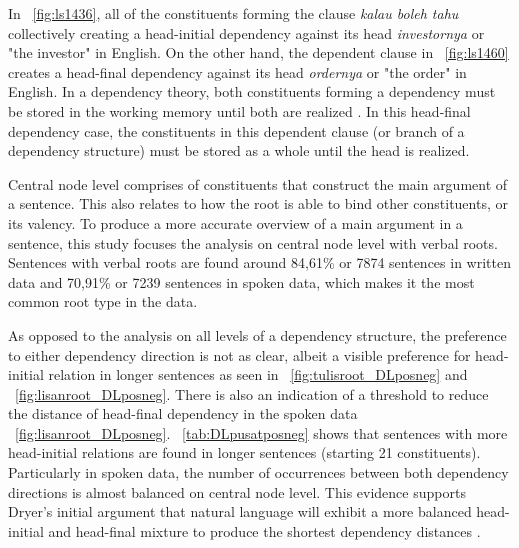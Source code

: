 \documentclass[10pt, a4paper, conference, compsocconf]{IEEEtran}
\begin{document}
In \pic~\ref{fig:ls1436}, all of the constituents forming the clause \textit{kalau boleh tahu} collectively creating a head-initial dependency against its head \textit{investornya} or "the investor" in English. On the other hand, the dependent clause in \pic~\ref{fig:ls1460} creates a head-final dependency against its head \textit{ordernya} or "the order" in English. In a dependency theory, both constituents forming a dependency must be stored in the working memory until both are realized \cite{tesniere1959elements}. In this head-final dependency case, the constituents in this dependent clause (or branch of a dependency structure) must be stored as a whole until the head is realized. 

Central node level comprises of constituents that construct the main argument of a sentence. This also relates to how the root is able to bind other constituents, or its valency. To produce a more accurate overview of a main argument in a sentence, this study focuses the analysis on central node level with verbal roots. Sentences with verbal roots are found around 84,61\% or 7874 sentences in written data and 70,91\% or 7239 sentences in spoken data, which makes it the most common root type in the data.

As opposed to the analysis on all levels of a dependency structure, the preference to either dependency direction is not as clear, albeit a visible preference for head-initial relation in longer sentences as seen in \pic~\ref{fig:tulisroot_DLposneg} and \pic~\ref{fig:lisanroot_DLposneg}. There is also an indication of a threshold to reduce the distance of head-final dependency in the spoken data \pic~\ref{fig:lisanroot_DLposneg}. \tab~\ref{tab:DLpusatposneg} shows that sentences with more head-initial relations are found in longer sentences (starting 21 constituents). Particularly in spoken data, the number of occurrences between both dependency directions is almost balanced on central node level. This evidence supports Dryer's initial argument that natural language will exhibit a more balanced head-initial and head-final mixture to produce the shortest dependency distances \cite{dryer1992greenbergian}.
\end{document}
